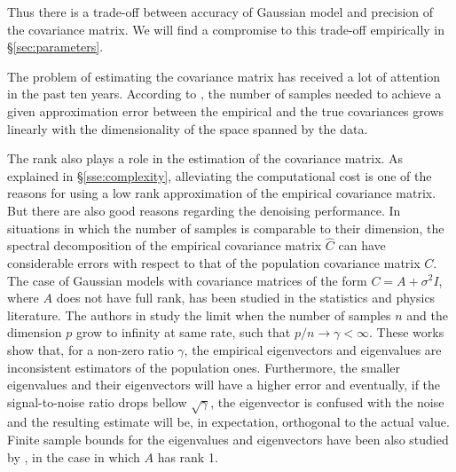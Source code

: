 \documentclass[10pt, a4paper]{article}
\newcommand{\pcomment}[1]{}
\begin{document}
Thus there is a trade-off between accuracy of Gaussian model and precision of the
covariance matrix. We will find a compromise to this trade-off empirically  in
\S \ref{sec:parameters}.


The problem of estimating the covariance matrix has received a lot of attention in the
past ten years.
According to \cite{Vershynin2012}, the number of samples needed to achieve a given approximation
error between the empirical and the true covariances grows linearly with the
dimensionality of the space spanned by the data. 

The rank also plays a role in the estimation of the covariance matrix.
As explained in \S \ref{sse:complexity}, alleviating the computational cost is
one of the reasons for using a low rank approximation of the empirical
covariance matrix. But there are also good reasons regarding the denoising
performance. In situations in which the number of samples 
is comparable to their dimension, the spectral decomposition of the empirical
covariance matrix $\widehat C$ can have considerable errors with respect to
that of the population covariance matrix $C$. 
%
The case of Gaussian models with covariance matrices of the form $C = A + \sigma^2I$,
where $A$ does not have full rank, has been studied in the statistics and physics
literature. The authors in \cite{johnstone2009,paul2007,nadler2008} study the
limit when the number of samples $n$ and the dimension $p$ grow to infinity at
same rate, such that $p/n\to\gamma < \infty$.  These works show that, for a
non-zero ratio $\gamma$, the empirical eigenvectors 
and eigenvalues are inconsistent estimators of the population ones.
Furthermore, the smaller eigenvalues and their eigenvectors will have a higher
error and eventually, if the signal-to-noise ratio drops bellow $\sqrt{\gamma}$, 
the eigenvector is confused with the noise and the resulting estimate will be,
in expectation, orthogonal to the actual value.
Finite sample bounds for the eigenvalues and eigenvectors have been also studied 
by \cite{nadler2008}, in the case in which $A$ has rank 1.
\pcomment{What can we say about this bounds.}
\end{document}
